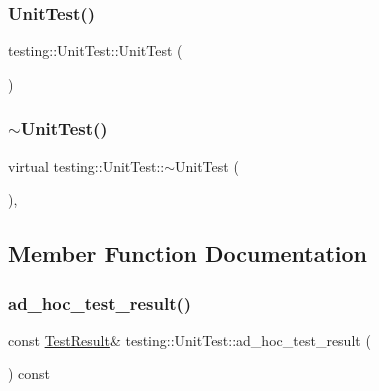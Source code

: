 \subsubsection{\texorpdfstring{Unit\+Test()}{UnitTest()}}
{\footnotesize\ttfamily testing\+::\+Unit\+Test\+::\+Unit\+Test (\begin{DoxyParamCaption}{ }\end{DoxyParamCaption})\hspace{0.3cm}{\ttfamily [private]}}

\mbox{\label{classtesting_1_1UnitTest_a6bbd0cfbacdf8e438f4e422916683c57}} 
\subsubsection{\texorpdfstring{$\sim$\+Unit\+Test()}{~UnitTest()}}
{\footnotesize\ttfamily virtual testing\+::\+Unit\+Test\+::$\sim$\+Unit\+Test (\begin{DoxyParamCaption}{ }\end{DoxyParamCaption})\hspace{0.3cm}{\ttfamily [private]}, {\ttfamily [virtual]}}



\subsection{Member Function Documentation}
\mbox{\label{classtesting_1_1UnitTest_afb26f53c070675638033436f35bad889}} 
\subsubsection{\texorpdfstring{ad\+\_\+hoc\+\_\+test\+\_\+result()}{ad\_hoc\_test\_result()}}
{\footnotesize\ttfamily const \hyperlink{classtesting_1_1TestResult}{Test\+Result}\& testing\+::\+Unit\+Test\+::ad\+\_\+hoc\+\_\+test\+\_\+result (\begin{DoxyParamCaption}{ }\end{DoxyParamCaption}) const}

